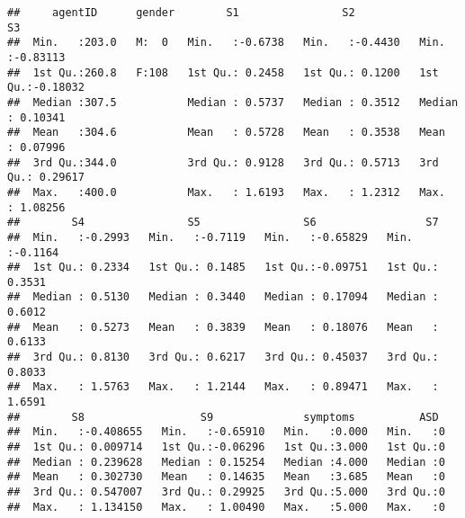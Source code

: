 \documentclass[]{article}
\begin{document}
\begin{verbatim}
##     agentID      gender        S1                S2                S3          
##  Min.   :203.0   M:  0   Min.   :-0.6738   Min.   :-0.4430   Min.   :-0.83113  
##  1st Qu.:260.8   F:108   1st Qu.: 0.2458   1st Qu.: 0.1200   1st Qu.:-0.18032  
##  Median :307.5           Median : 0.5737   Median : 0.3512   Median : 0.10341  
##  Mean   :304.6           Mean   : 0.5728   Mean   : 0.3538   Mean   : 0.07996  
##  3rd Qu.:344.0           3rd Qu.: 0.9128   3rd Qu.: 0.5713   3rd Qu.: 0.29617  
##  Max.   :400.0           Max.   : 1.6193   Max.   : 1.2312   Max.   : 1.08256  
##        S4                S5                S6                 S7         
##  Min.   :-0.2993   Min.   :-0.7119   Min.   :-0.65829   Min.   :-0.1164  
##  1st Qu.: 0.2334   1st Qu.: 0.1485   1st Qu.:-0.09751   1st Qu.: 0.3531  
##  Median : 0.5130   Median : 0.3440   Median : 0.17094   Median : 0.6012  
##  Mean   : 0.5273   Mean   : 0.3839   Mean   : 0.18076   Mean   : 0.6133  
##  3rd Qu.: 0.8130   3rd Qu.: 0.6217   3rd Qu.: 0.45037   3rd Qu.: 0.8033  
##  Max.   : 1.5763   Max.   : 1.2144   Max.   : 0.89471   Max.   : 1.6591  
##        S8                  S9              symptoms          ASD   
##  Min.   :-0.408655   Min.   :-0.65910   Min.   :0.000   Min.   :0  
##  1st Qu.: 0.009714   1st Qu.:-0.06296   1st Qu.:3.000   1st Qu.:0  
##  Median : 0.239628   Median : 0.15254   Median :4.000   Median :0  
##  Mean   : 0.302730   Mean   : 0.14635   Mean   :3.685   Mean   :0  
##  3rd Qu.: 0.547007   3rd Qu.: 0.29925   3rd Qu.:5.000   3rd Qu.:0  
##  Max.   : 1.134150   Max.   : 1.00490   Max.   :5.000   Max.   :0
\end{verbatim}
\end{document}
